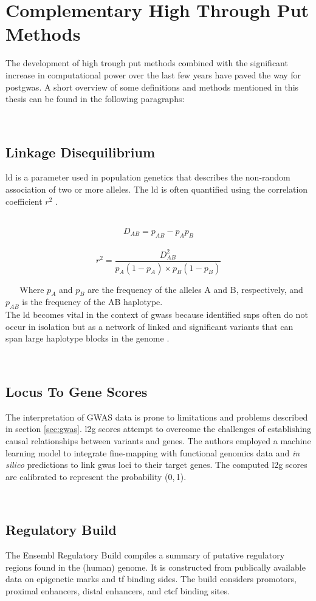     \section{Complementary High Through Put Methods}
    \label{sec:bioinformatics}
    The development of high trough put methods combined with the significant increase in computational power over the last few years have paved the way for post\ac{gwas}. A short overview of some definitions and methods mentioned in this thesis can be found in the following paragraphs:

    \subsection{Linkage Disequilibrium}
    \label{subsec:ld}
    \Ac{ld} is a parameter used in population genetics that describes the non-random association of two or more alleles. The \ac{ld} is often quantified using the correlation coefficient $r^2$ \cite{slatkinLinkageDisequilibriumUnderstanding2008}.

        $$ D_{AB} = p_{AB} − p_A p_B $$
        $$ r^2 = \frac{D_{AB}^2}{p_A (1-p_A) \times p_B (1-p_B)} $$

    Where $p_A$ and $p_B$ are the frequency of the alleles A and B, respectively, and $p_{AB}$ is the frequency of the AB haplotype.\\
    The \ac{ld} becomes vital in the context of \acp{gwas} because identified \acp{snp} often do not occur in isolation but as a network of linked and significant variants that can span large haplotype blocks in the genome \cite{slatkinLinkageDisequilibriumUnderstanding2008}.

    \subsection{Locus To Gene Scores}
    The interpretation of GWAS data is prone to limitations and problems described in section \ref{sec:gwas}. \Ac{l2g} scores attempt to overcome the challenges of establishing causal relationships between variants and genes. The authors employed a machine learning model to integrate fine-mapping with functional genomics data and \textit{in silico} predictions to link \ac{gwas} loci to their target genes. The computed \ac{l2g} scores are calibrated to represent the probability (0,\,1). \cite{mountjoyOpenApproachSystematically2021}

    \subsection{Regulatory Build}
    The Ensembl Regulatory Build compiles a summary of putative regulatory regions found in the (human) genome. It is constructed from publically available data on epigenetic marks and \ac{tf} binding sides. The build considers promotors, proximal enhancers, distal enhancers, and \ac{ctcf} binding sites. \cite{zerbinoEnsemblRegulatoryBuild2015}

